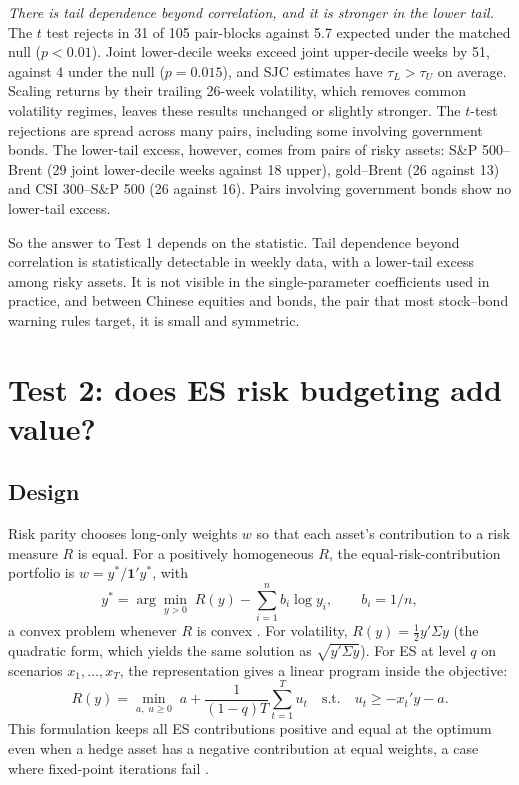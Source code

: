 \documentclass[11pt]{article}
\newcommand{\1}{\mathbf{1}}
\begin{document}
\emph{There is tail dependence beyond correlation, and it is stronger in the lower tail.} The $t$ test rejects in 31
of 105 pair-blocks against 5.7 expected under the matched null ($p<0.01$). Joint lower-decile weeks exceed
joint upper-decile weeks by 51, against 4 under the null ($p=0.015$), and SJC estimates have
$\tau_L>\tau_U$ on average. Scaling returns by their trailing 26-week volatility, which removes common
volatility regimes, leaves these results unchanged or slightly stronger. The $t$-test rejections are spread
across many pairs, including some involving government bonds. The lower-tail excess, however, comes from pairs of
risky assets: S\&P 500--Brent (29 joint lower-decile weeks against 18 upper), gold--Brent (26 against 13) and
CSI 300--S\&P 500 (26 against 16). Pairs involving government bonds show no lower-tail excess.

So the answer to Test 1 depends on the statistic. Tail dependence beyond correlation is statistically
detectable in weekly data, with a lower-tail excess among risky assets. It is not visible in the single-parameter coefficients used in
practice, and between Chinese equities and bonds, the pair that most stock--bond warning rules target, it is
small and symmetric.

\section{Test 2: does ES risk budgeting add value?}
\label{sec:test2}

\subsection{Design}

Risk parity chooses long-only weights $w$ so that each asset's contribution to a risk measure $R$ is equal.
For a positively homogeneous $R$, the equal-risk-contribution portfolio is $w=y^*/\mathbf{1}'y^*$, with
\begin{equation}
y^* = \arg\min_{y>0}\; R(y) - \sum_{i=1}^{n} b_i\log y_i ,\qquad b_i = 1/n,
\end{equation}
a convex problem whenever $R$ is convex \citep{spinu2013,maillard2010}. For volatility,
$R(y)=\tfrac12 y'\Sigma y$ (the quadratic form, which yields the same solution as $\sqrt{y'\Sigma y}$).
For ES at level $q$ on scenarios $x_1,\dots,x_T$, the \citet{rockafellar2000} representation gives a linear
program inside the objective:
\begin{equation}
R(y) = \min_{a,\;u\ge 0}\; a + \frac{1}{(1-q)T}\sum_{t=1}^{T}u_t \quad\text{s.t.}\quad u_t\ge -x_t'y - a .
\end{equation}
This formulation keeps all ES contributions positive and equal at the optimum even when a hedge asset has a
negative contribution at equal weights, a case where fixed-point iterations fail \citep{mausser2018}.
\end{document}
